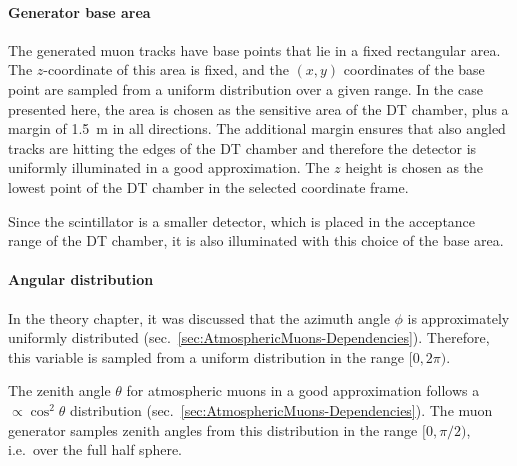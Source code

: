 \paragraph{Generator base area}
The generated muon tracks have base points that lie in a fixed rectangular area. The $z$-coordinate of this area is fixed, and the $(x,y)$ coordinates of the base point are sampled from a uniform distribution over a given range. In the case presented here, the area is chosen as the sensitive area of the \ac{DT} chamber, plus a margin of \SI{1.5}{\meter} in all directions. The additional margin ensures that also angled tracks are hitting the edges of the \ac{DT} chamber and therefore the detector is uniformly illuminated in a good approximation. The $z$ height is chosen as the lowest point of the \ac{DT} chamber in the selected coordinate frame.
\par Since the scintillator is a smaller detector, which is placed in the acceptance range of the \ac{DT} chamber, it is also illuminated with this choice of the base area.
\paragraph{Angular distribution}
In the theory chapter, it was discussed that the azimuth angle $\phi$ is approximately uniformly distributed (sec.\ \ref{sec:AtmosphericMuons-Dependencies}). Therefore, this variable is sampled from a uniform distribution in the range $[0, 2\pi)$.
\par The zenith angle $\theta$ for atmospheric muons in a good approximation follows a $\propto \cos^2\theta$ distribution (sec.\ \ref{sec:AtmosphericMuons-Dependencies}). The muon generator samples zenith angles from this distribution in the range $[0, \pi/2)$, i.e.\ over the full half sphere.
